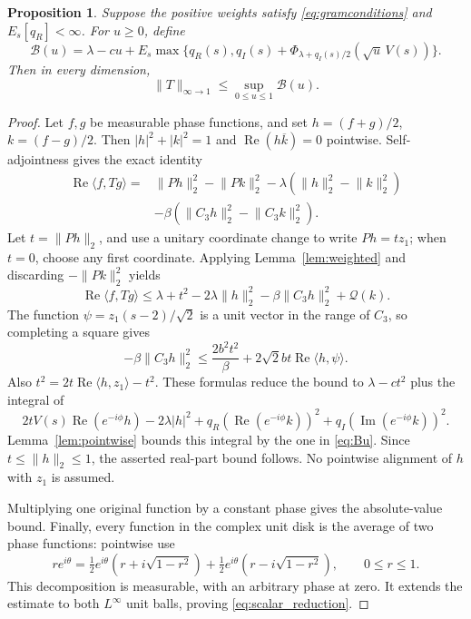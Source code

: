 \documentclass[11pt]{article}
\newtheorem{proposition}[theorem]{Proposition}
\theoremstyle{remark}\newtheorem{remark}[theorem]{Remark}
\newcommand{\ip}[2]{\langle #1,#2\rangle}
\newcommand{\norm}[1]{\lVert #1\rVert}
\DeclareMathOperator{\Rea}{Re}
\begin{document}
\begin{proposition}\label{prop:scalar}
Suppose the positive weights satisfy \eqref{eq:gramconditions} and
\(E_s[q_R]<\infty\). For \(u\ge0\), define
\begin{equation}\label{eq:Bu}
\mathcal B(u)=\lambda-cu+
E_s\max\{q_R(s),q_I(s)+
\Phi_{\lambda+q_I(s)/2}(\sqrt u\,V(s))\}.
\end{equation}
Then in every dimension,
\begin{equation}\label{eq:scalar_reduction}
\norm T_{\infty\to1}\le\sup_{0\le u\le1}\mathcal B(u).
\end{equation}
\end{proposition}
\begin{proof}
Let \(f,g\) be measurable phase functions, and set
\(h=(f+g)/2\), \(k=(f-g)/2\). Then
\(|h|^2+|k|^2=1\) and \(\Rea(h\overline k)=0\) pointwise.
Self-adjointness gives the exact identity
\begin{align*}
\Rea\ip f{Tg}
={}&\norm{Ph}_2^2-\norm{Pk}_2^2
-\lambda(\norm h_2^2-\norm k_2^2)\\
&-\beta(\norm{C_3h}_2^2-\norm{C_3k}_2^2).
\end{align*}
Let \(t=\norm{Ph}_2\), and use a unitary coordinate change to write
\(Ph=tz_1\); when \(t=0\), choose any first coordinate. Applying
Lemma~\ref{lem:weighted} and discarding \(-\norm{Pk}_2^2\) yields
\[
\Rea\ip f{Tg}\le\lambda+t^2-2\lambda\norm h_2^2
-\beta\norm{C_3h}_2^2+\mathcal Q(k).
\]
The function \(\psi=z_1(s-2)/\sqrt2\) is a unit vector in the range
of \(C_3\), so completing a square gives
\[
-\beta\norm{C_3h}_2^2
\le\frac{2b^2t^2}{\beta}+2\sqrt2bt\Rea\ip h\psi.
\]
Also \(t^2=2t\Rea\ip h{z_1}-t^2\). These formulas reduce the
bound to \(\lambda-ct^2\) plus the integral of
\[
2tV(s)\Rea(e^{-i\phi}h)-2\lambda|h|^2
+q_R(\Rea(e^{-i\phi}k))^2
+q_I(\operatorname{Im}(e^{-i\phi}k))^2.
\]
Lemma~\ref{lem:pointwise} bounds this integral by the one in
\eqref{eq:Bu}. Since \(t\le\norm h_2\le1\), the asserted
real-part bound follows. No pointwise alignment of \(h\) with
\(z_1\) is assumed.

Multiplying one original function by a constant phase gives the
absolute-value bound. Finally, every function in the complex unit
disk is the average of two phase functions: pointwise use
\[
re^{i\theta}=\tfrac12e^{i\theta}(r+i\sqrt{1-r^2})
+\tfrac12e^{i\theta}(r-i\sqrt{1-r^2}),\qquad0\le r\le1.
\]
This decomposition is measurable, with an arbitrary phase at zero.
It extends the estimate to both \(L^\infty\) unit balls, proving
\eqref{eq:scalar_reduction}.
\end{proof}
\end{document}
